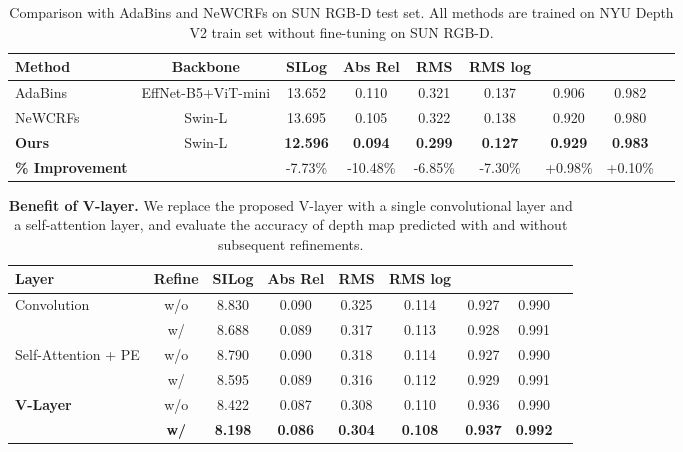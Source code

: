 \documentclass{article} \usepackage{iclr2023_conference, times}
\begin{document}
\begin{table}
\begin{center}
\scriptsize
\caption{\small Comparison with AdaBins and NeWCRFs on SUN RGB-D test set. All methods are trained on NYU Depth V2 train set {without} fine-tuning on SUN RGB-D. }
\label{tab:sun_sota}
\begin{tabular*}{1.0\textwidth}{l@{\extracolsep{\fill}}cccccccc}
\hline
Method & Backbone &SILog  & Abs Rel & RMS & RMS log &    &  \\
\hline
AdaBins\citep{bhat2021adabins} & EffNet-B5+ViT-mini & 13.652 & 0.110 & 0.321 & 0.137 & 0.906 & 0.982\\
NeWCRFs~\citep{yuan2022new} & Swin-L & 13.695 & 0.105 & 0.322 & 0.138 & 0.920 & 0.980\\
\hline
\textbf{Ours} &Swin-L & \textbf{12.596}  & \textbf{0.094} & \textbf{0.299} & \textbf{0.127} & \textbf{0.929} & \textbf{0.983}\\
\textbf{\% Improvement} & &\textcolor{ao}{-7.73\%} & \textcolor{ao}{-10.48\%} & \textcolor{ao}{-6.85\%} & \textcolor{ao}{-7.30\%} & \textcolor{ao}{+0.98\%} & \textcolor{ao}{+0.10\%} \\
\hline
\end{tabular*}
\end{center}
\end{table}






\begin{table}
\begin{center}
\scriptsize
\caption{\small \textbf{Benefit of V-layer.} We replace the proposed V-layer with a single convolutional layer and a self-attention layer, and evaluate the accuracy of depth map predicted with and without subsequent refinements. }
\label{tab:ablation_vlayer}
\begin{tabular*}{1.0\textwidth}{l@{\extracolsep{\fill}}cccccccc}
\hline
Layer & Refine & SILog  & Abs Rel & RMS & RMS log  &   &  \\
\hline
\multirow{2}{*}{Convolution}& w/o & 8.830 & 0.090 & 0.325 & 0.114 & 0.927 & 0.990 \\
 & w/ & 8.688 & 0.089 & 0.317 & 0.113 & 0.928 & 0.991\\

\hline
\multirow{2}{*}{Self-Attention + PE} & w/o & 8.790 & 0.090 & 0.318 & 0.114 & 0.927 & 0.990\\
 & w/ & 8.595 & 0.089 & 0.316 & 0.112 & 0.929 & 0.991\\
\hline
\multirow{2}{*}{\textbf{V-Layer}}& w/o & 8.422 & 0.087 & 0.308 & 0.110 & 0.936 & 0.990\\
 & \textbf{w/} & \textbf{8.198} & \textbf{0.086} & \textbf{0.304} & \textbf{0.108} & \textbf{0.937} & \textbf{0.992}\\
\hline
\end{tabular*}
\end{center}
\end{table}
\end{document}
